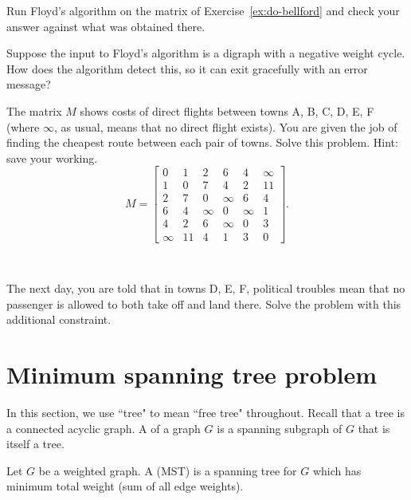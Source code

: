 \begin{Exercise}
\label{do-floyd}
Run Floyd's algorithm on the matrix of Exercise~\ref{ex:do-bellford}
and check your answer against what was obtained there.
\end{Exercise}

\begin{Exercise}
\label{ex:floyd-neg-cycle}
Suppose the input to Floyd's algorithm is a digraph with a negative
weight cycle. How does the algorithm detect this, so it can exit
gracefully with an error message?
\end{Exercise}

\begin{samepage}
\begin{Exercise}
\label{ex:do-floyd-trick}
\item The matrix $M$ shows costs of direct flights between towns A,
B, C, D, E, F (where $\infty$, as usual, means that no direct flight
exists). You are given the job of finding the cheapest route between
each pair of towns. Solve this problem. Hint: save your working.
$$
M = \left[
\begin{matrix}
 0 & 1 & 2 & 6 & 4 & \infty \\
 1 & 0 & 7 & 4 & 2 & 11 \\
2 & 7 & 0 & \infty & 6 & 4\\
 6 & 4 & \infty & 0 & \infty & 1 \\
 4 & 2 & 6 & \infty & 0 & 3 \\
 \infty &11 & 4 & 1 & 3 & 0
\end{matrix}
\right].
$$

\

The next day, you are told that in towns D, E, F, political troubles
mean that no passenger is  allowed to both take off and land there. Solve
the problem with this additional constraint.
\end{Exercise}
\end{samepage}

\section{Minimum spanning tree problem}
\label{sec:MST}
In this section, we use ``tree" to mean ``free tree" throughout.
Recall that a tree is a connected acyclic graph. A  of a graph $G$ is a spanning subgraph of $G$ that is itself a tree.

\begin{Definition}
Let $G$ be a weighted graph. A  (MST) 
is a spanning tree for $G$ which has minimum total weight 
(sum of all edge weights). 
\end{Definition}

